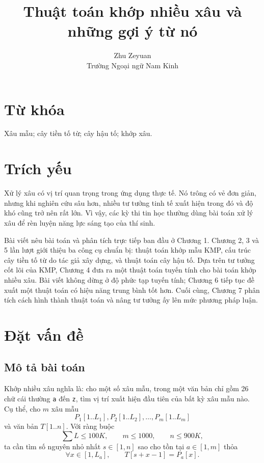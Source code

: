 \documentclass[11pt]{article}
\title{Thuật toán khớp nhiều xâu và những gợi ý từ nó}
\author{Zhu Zeyuan\\Trường Ngoại ngữ Nam Kinh}
\date{}
\begin{document}
\maketitle


\section*{Từ khóa}

Xâu mẫu; cây tiền tố từ; cây hậu tố; khớp xâu.

\section*{Trích yếu}

Xử lý xâu có vị trí quan trọng trong ứng dụng thực tế. Nó trông có vẻ đơn
giản, nhưng khi nghiên cứu sâu hơn, nhiều tư tưởng tinh tế xuất hiện trong đó
và độ khó cũng trở nên rất lớn. Vì vậy, các kỳ thi tin học thường dùng bài
toán xử lý xâu để rèn luyện năng lực sáng tạo của thí sinh.

Bài viết nêu bài toán và phân tích trực tiếp ban đầu ở Chương 1. Chương 2,
3 và 5 lần lượt giới thiệu ba công cụ chuẩn bị: thuật toán khớp mẫu KMP, cấu
trúc cây tiền tố từ do tác giả xây dựng, và thuật toán cây hậu tố. Dựa trên tư
tưởng cốt lõi của KMP, Chương 4 đưa ra một thuật toán tuyến tính cho bài toán
khớp nhiều xâu. Bài viết không dừng ở độ phức tạp tuyến tính; Chương 6 tiếp
tục đề xuất một thuật toán có hiệu năng trung bình tốt hơn. Cuối cùng, Chương
7 phân tích cách hình thành thuật toán và nâng tư tưởng ấy lên mức phương
pháp luận.

\tableofcontents

\section{Đặt vấn đề}

\subsection{Mô tả bài toán}

Khớp nhiều xâu nghĩa là: cho một số xâu mẫu, trong một văn bản chỉ gồm 26 chữ
cái thường \texttt{a} đến \texttt{z}, tìm vị trí xuất hiện đầu tiên của bất kỳ
xâu mẫu nào. Cụ thể, cho $m$ xâu mẫu
\[
  P_1[1..L_1], P_2[1..L_2], \ldots, P_m[1..L_m]
\]
và văn bản $T[1..n]$. Với ràng buộc
\[
  \sum L \le 100K,\qquad m\le 1000,\qquad n\le 900K,
\]
ta cần tìm số nguyên nhỏ nhất $s\in[1,n]$ sao cho tồn tại $a\in[1,m]$ thỏa
\[
  \forall x\in[1,L_a],\qquad T[s+x-1]=P_a[x].
\]
\end{document}
